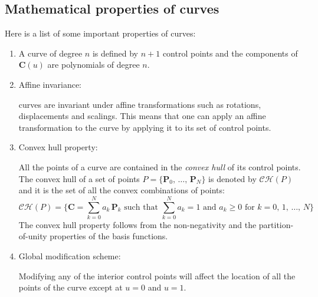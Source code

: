 \subsection{Mathematical properties of \Bezier  curves}
Here is a list of some important properties of \Bezier curves:

\begin{enumerate}

    \item A \Bezier curve of degree $n$ is defined by $n+1$ control points and the components of $\mathbf{C}(u)$ are polynomials of degree $n$.
    
    \item Affine invariance:
    
    \Bezier curves are invariant under affine transformations such as rotations, displacements and scalings. This means that one can apply an affine transformation to the \Bezier curve by applying it to its set of control points.
    
    \item Convex hull property:
    
    All the points of a \Bezier curve are contained in the \textit{convex hull} of its control points.
    The convex hull of a set of points $P = \{\mathbf{P}_{0},\, \dots,\, \mathbf{P}_{N}\}$ is denoted by $\mathcal{CH}(P)$ and it is the set of all the convex combinations of points:
    \begin{equation*}
     \mathcal{CH}(P) = \Big\{ \mathbf{C} =  \sum_{k=0}^{N} a_{k} \, \mathbf{P}_{k} \text{ such that } \sum_{k=0}^{N} a_{k} = 1 \text{ and } a_{k}\geq 0 \text{ for } k = 0,\, 1,\, \dots,\, N\Big\}
    \end{equation*}
    The convex hull property follows from the non-negativity and the partition-of-unity properties of the basis functions.
    
    \item Global modification scheme:
    
    Modifying any of the interior control points will affect the location of all the points of the \Bezier curve except at $u=0$ and $u=1$.
    

\end{enumerate}
